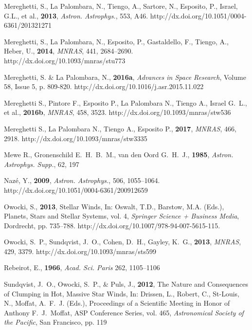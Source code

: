 \documentclass[USenglish,twocolumn]{article}
\begin{document}
\begin{thebibliography}{}
Mereghetti, S., La Palombara, N., Tiengo, A., Sartore, N., Esposito, P., Israel, G.L., et al., \textbf{2013}, \textit{Astron. Astrophys.}, 553, A46. http://dx.doi.org/10.1051/0004-6361/201321271

Mereghetti, S., La Palombara, N., Esposito, P., Gastaldello, F., Tiengo, A., Heber, U., \textbf{2014}, \textit{MNRAS}, 441, 2684–2690. http://dx.doi.org/10.1093/mnras/stu773

Mereghetti, S. \& La Palombara, N., \textbf{2016a}, \textit{Advances in Space Research}, Volume 58, Issue 5, p. 809-820. http://dx.doi.org/10.1016/j.asr.2015.11.022

Mereghetti S., Pintore F., Esposito P., La Palombara N., Tiengo A., Israel G.~L., et al., \textbf{2016b}, \textit{MNRAS}, 458, 3523. http://dx.doi.org/10.1093/mnras/stw536

Mereghetti S., La Palombara N., Tiengo A., Esposito P., \textbf{2017}, \textit{MNRAS}, 466, 2918. http://dx.doi.org/10.1093/mnras/stw3335

Mewe R., Gronenschild E.~H.~B.~M., van den Oord G.~H.~J., \textbf{1985}, \textit{Astron. Astrophys. Supp.}, 62, 197

Naz\'e, Y., \textbf{2009}, \textit{Astron. Astrophys.}, 506, 1055–1064. http://dx.doi.org/10.1051/0004-6361/200912659

Owocki, S., \textbf{2013}, Stellar Winds, In: Oswalt, T.D., Barstow, M.A. (Eds.), Planets, Stars and Stellar Systems, vol. 4, \textit{Springer Science + Business Media}, Dordrecht, pp. 735–788. http://dx.doi.org/10.1007/978-94-007-5615-115.

Owocki, S.~P., Sundqvist, J.~O., Cohen, D.~H., Gayley, K.~G., \textbf{2013}, \textit{MNRAS}, 429, 3379. http://dx.doi.org/10.1093/mnras/sts599

Rebeirot, E., \textbf{1966}, \textit{Acad. Sci. Paris} 262, 1105–1106

Sundqvist, J.~O., Owocki, S.~P., \& Puls, J., \textbf{2012}, The Nature and Consequences of Clumping in Hot, Massive Star Winds, In: Drissen, L., Robert, C., St-Louis, N., Moffat, A.~F.~J. (Eds.), Proceedings of a Scientific Meeting in Honor of Anthony F.~J.~Moffat, ASP Conference Series, vol. 465, \textit{Astronomical Society of the Pacific}, San Francisco, pp. 119


\end{thebibliography}
\end{document}
